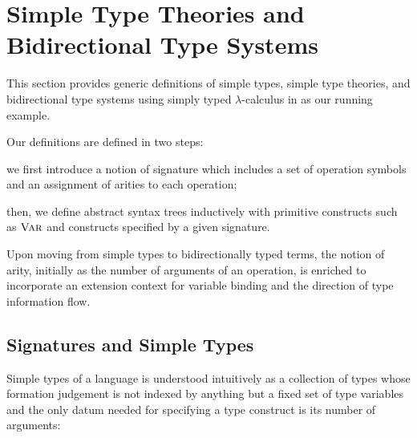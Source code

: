 
\section{Simple Type Theories and Bidirectional Type Systems}\label{sec:defs}
This section provides generic definitions
of simple types, simple type theories, and bidirectional type systems using simply typed $\lambda$-calculus in  as our running example.

Our definitions are defined in two steps:
\begin{enumerate*}
\item we first introduce a notion of signature which includes a set of operation symbols and an assignment of arities to each operation;
\item then, we define abstract syntax trees inductively with primitive constructs such as $\textnormal{\textsc{Var}}$ and constructs specified by a given signature.
\end{enumerate*}
Upon moving from simple types to bidirectionally typed terms, the notion of arity, initially as the number of arguments of an operation, is enriched to incorporate an extension context for variable binding and the direction of type information flow.

\subsection{Signatures and Simple Types} \label{subsec:simple-types}
Simple types of a language is understood intuitively as a collection of types whose formation judgement is not indexed by anything but a fixed set of type variables and the only datum needed for specifying a type construct is its number of arguments: 

